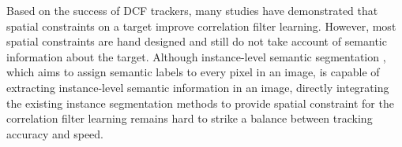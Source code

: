 Based on the success of DCF trackers, many studies \cite{Danelljan2015LearningSR, Lukezic2017DiscriminativeCF} have demonstrated that spatial constraints on a target improve correlation filter learning. However, most spatial constraints are hand designed and still do not take account of semantic information about the target. Although instance-level semantic segmentation \cite{Pinheiro2015LearningTS, Zhang2019ProgressivelyDN}, which aims to assign semantic labels to every pixel in an image, is capable of extracting instance-level semantic information in an image, directly integrating the existing instance segmentation methods to provide spatial constraint for the correlation filter learning remains hard to strike a balance between tracking accuracy and speed.

\begin{figure}
\centering
              \hspace{-0.6em}        
              \hspace{-0.6em}        
              \hspace{-0.6em}        
              \hspace{-0.6em}        
    \\[0.2ex]

\end{figure}
